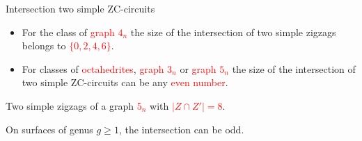 \documentclass[%
pdf,
colorBG,
slideColor,
]{prosper}
\begin{document}
\begin{slide}{Intersection two simple ZC-circuits}
\vspace{-3mm}
\begin{itemize}
\item For the class of \textcolor{red}{graph $4_n$} the size of the intersection of two simple zigzags belongs to \textcolor{red}{$\{0,2,4,6\}$}.
\item For classes of \textcolor{red}{octahedrites}, \textcolor{red}{graph $3_n$} or \textcolor{red}{graph $5_n$} the size of the intersection of two simple ZC-circuits can be any \textcolor{red}{even number}.
\end{itemize}
\begin{center}
\begin{minipage}{7cm}
\centering
\vspace{-5mm}
\end{minipage}
\begin{minipage}{4cm}
Two simple zigzags of a graph \textcolor{red}{$5_n$} with \textcolor{red}{$|Z\cap Z'|=8$}.\par
\vspace{1cm}
On surfaces of genus $g\geq 1$, the intersection can be odd.
\end{minipage}

\end{center}


\end{slide}







%
%
%
%


\end{document}
